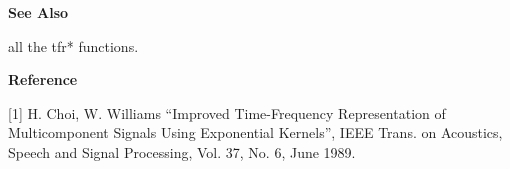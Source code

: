 {\bf \large \sf See Also}\\
\hspace*{1.5cm}
\begin{minipage}[t]{13.5cm}
all the {\ty tfr*} functions.
\end{minipage}
\vspace*{.5cm}


{\bf \large \sf Reference}\\
\hspace*{1.5cm}
\begin{minipage}[t]{13.5cm}
[1] H. Choi, W. Williams ``Improved Time-Frequency Representation of
Multicomponent Signals Using Exponential Kernels'', IEEE Trans. on
Acoustics, Speech and Signal Processing, Vol. 37, No. 6, June 1989.
\end{minipage}

